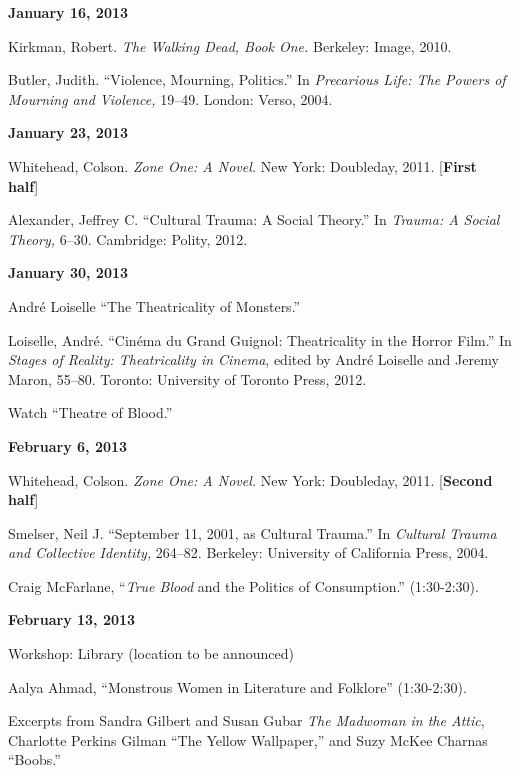 \documentclass[12pt]{article}
\begin{document}
\textbf{January 16, 2013}

\begin{hangparas}{.5in}{1}
Kirkman, Robert. \textit{The Walking Dead, Book One.} Berkeley: Image, 2010.

Butler, Judith. ``Violence, Mourning, Politics.'' In \textit{Precarious Life: The Powers of Mourning and Violence,} 19--49. London: Verso, 2004.
\end{hangparas}

\textbf{January 23, 2013}

\begin{hangparas}{.5in}{1}
Whitehead, Colson. \textit{Zone One: A Novel.} New York: Doubleday, 2011. [\textbf{First half}]

Alexander, Jeffrey C. ``Cultural Trauma: A Social Theory.'' In \textit{Trauma: A Social Theory,} 6--30. Cambridge: Polity, 2012.
\end{hangparas}

\textbf{January 30, 2013}

\begin{hangparas}{.5in}{1}
Andr\'e Loiselle ``The Theatricality of Monsters.''

Loiselle, Andr\'e. ``Cin\'ema du Grand Guignol: Theatricality in the Horror Film.'' In \textit{Stages of Reality: Theatricality in Cinema}, edited by Andr\'e Loiselle and Jeremy Maron, 55--80. Toronto: University of Toronto Press, 2012.

Watch ``Theatre of Blood.''
\end{hangparas}

\textbf{February 6, 2013}

\begin{hangparas}{.5in}{1}
Whitehead, Colson. \textit{Zone One: A Novel.} New York: Doubleday, 2011. [\textbf{Second half}]

Smelser, Neil J. ``September 11, 2001, as Cultural Trauma.'' In \textit{Cultural Trauma and Collective Identity,} 264--82. Berkeley: University of California Press, 2004.

Craig McFarlane, ``\textit{True Blood} and the Politics of Consumption.'' (1:30-2:30).
\end{hangparas}

\textbf{February 13, 2013}

Workshop: Library (location to be announced)

Aalya Ahmad, ``Monstrous Women in Literature and Folklore'' (1:30-2:30).

Excerpts from Sandra Gilbert and Susan Gubar \textit{The Madwoman in the Attic}, Charlotte Perkins Gilman ``The Yellow Wallpaper,'' and Suzy McKee Charnas ``Boobs.''
\end{document}

